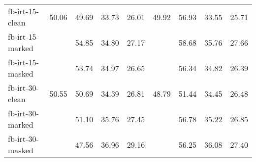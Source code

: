 \begin{tabular}{| l | r | r | r | r | r | r | r | r |}
    fb-irt-15-clean    & 50.06 & 49.69 & 33.73 & 26.01 & 49.92 & 56.93 & 33.55 & 25.71 \\
    fb-irt-15-marked   &       & 54.85 & 34.80 & 27.17 &       & 58.68 & 35.76 & 27.66 \\
    fb-irt-15-masked   &       & 53.74 & 34.97 & 26.65 &       & 56.34 & 34.82 & 26.39 \\ \hline
    fb-irt-30-clean    & 50.55 & 50.69 & 34.39 & 26.81 & 48.79 & 51.44 & 34.45 & 26.48 \\
    fb-irt-30-marked   &       & 51.10 & 35.76 & 27.45 &       & 56.78 & 35.22 & 26.85 \\
    fb-irt-30-masked   &       & 47.56 & 36.96 & 29.16 &       & 56.25 & 36.08 & 27.40 \\ \hline

\end{tabular}
